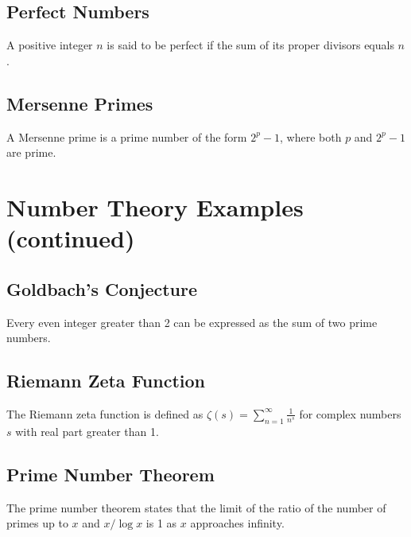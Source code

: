 \documentclass{article}
\begin{document}
\subsection{Perfect Numbers}

\begin{definition}
A positive integer $n$ is said to be perfect if the sum of its proper divisors equals $n$.
\end{definition}

\subsection{Mersenne Primes}

\begin{definition}
A Mersenne prime is a prime number of the form $2^p - 1$, where both $p$ and $2^p - 1$ are prime.
\end{definition}



\section{Number Theory Examples (continued)}

\subsection{Goldbach's Conjecture}

\begin{theorem}
Every even integer greater than 2 can be expressed as the sum of two prime numbers.
\end{theorem}

\subsection{Riemann Zeta Function}

\begin{definition}
The Riemann zeta function is defined as $\zeta(s) = \sum_{n=1}^\infty \frac{1}{n^s}$ for complex numbers $s$ with real part greater than 1.
\end{definition}

\subsection{Prime Number Theorem}

\begin{theorem}
The prime number theorem states that the limit of the ratio of the number of primes up to $x$ and $x/\log x$ is 1 as $x$ approaches infinity.
\end{theorem}
\end{document}
